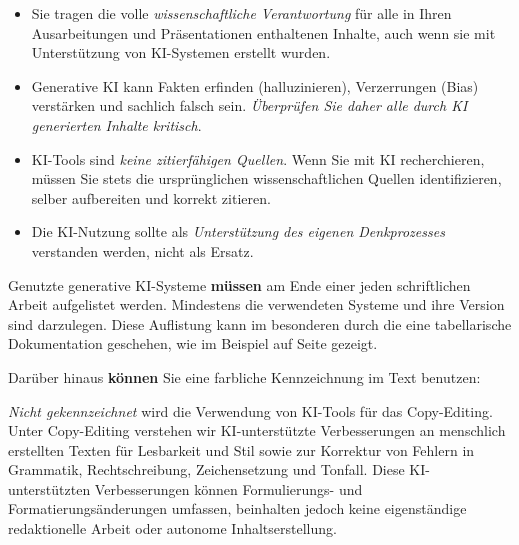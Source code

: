 \documentclass[11pt,        %
  english,ngerman,          %
  paper=a4,                 %
  captions=tablesignature,  %
  listof=numbered,          %
  bibliography=totoc,       %
  headings=small,           %
  headinclude=false,        %
  footinclude=false,        %
  parskip=half-,            %
  oneside,                  %
  BCOR=15mm,                 %
  DIV=12                    %
  ]{scrbook}                %
\begin{document}
\begin{itemize}
  \item Sie tragen die volle \textit{wissenschaftliche Verantwortung} für alle in Ihren Ausarbeitungen und Präsentationen enthaltenen Inhalte, auch wenn sie mit Unterstützung von KI-Systemen erstellt wurden.
  \item Generative KI kann Fakten erfinden (halluzinieren), Verzerrungen (Bias) verstärken und sachlich falsch sein. \textit{Überprüfen Sie daher alle durch KI generierten Inhalte kritisch}.    
  \item KI-Tools sind \textit{keine zitierfähigen Quellen}. Wenn Sie mit KI recherchieren, müssen Sie stets die ursprünglichen wissenschaftlichen Quellen identifizieren, selber aufbereiten und korrekt zitieren.
  \item Die KI-Nutzung sollte als \textit{Unterstützung des eigenen Denkprozesses} verstanden werden, nicht als Ersatz.
\end{itemize}

Genutzte generative KI-Systeme \textbf{müssen} am Ende einer jeden schriftlichen Arbeit aufgelistet werden. Mindestens die verwendeten Systeme und ihre Version sind darzulegen. Diese Auflistung kann im besonderen durch die eine tabellarische Dokumentation geschehen, wie im Beispiel auf Seite \pageref{sec:ai_use} gezeigt.

 
Darüber hinaus \textbf{können} Sie eine farbliche Kennzeichnung im Text benutzen:
  

  
\textit{Nicht gekennzeichnet} wird die Verwendung von KI-Tools für das Copy-Editing. Unter Copy-Editing verstehen wir KI-unterstützte Verbesserungen an menschlich erstellten Texten für Lesbarkeit und Stil sowie zur Korrektur von Fehlern in Grammatik, Rechtschreibung, Zeichensetzung und Tonfall. Diese KI-unterstützten Verbesserungen können Formulierungs- und Formatierungsänderungen umfassen, beinhalten jedoch keine eigenständige redaktionelle Arbeit oder autonome Inhaltserstellung.
\end{document}
